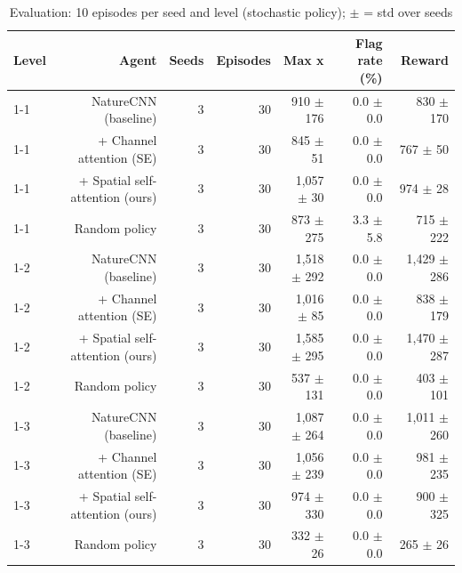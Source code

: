 \begin{table}[t]
\centering
\caption{Evaluation: 10 episodes per seed and level (stochastic policy); $\pm$ = std over seeds}
\label{tab:eval_summary}
\begin{tabular}{lrrrrrr}
\toprule
Level & Agent & Seeds & Episodes & Max x & Flag rate (\%) & Reward \\
\midrule
1-1 & NatureCNN (baseline) & 3 & 30 & 910 $\pm$ 176 & 0.0 $\pm$ 0.0 & 830 $\pm$ 170 \\
1-1 & + Channel attention (SE) & 3 & 30 & 845 $\pm$ 51 & 0.0 $\pm$ 0.0 & 767 $\pm$ 50 \\
1-1 & + Spatial self-attention (ours) & 3 & 30 & 1,057 $\pm$ 30 & 0.0 $\pm$ 0.0 & 974 $\pm$ 28 \\
1-1 & Random policy & 3 & 30 & 873 $\pm$ 275 & 3.3 $\pm$ 5.8 & 715 $\pm$ 222 \\
1-2 & NatureCNN (baseline) & 3 & 30 & 1,518 $\pm$ 292 & 0.0 $\pm$ 0.0 & 1,429 $\pm$ 286 \\
1-2 & + Channel attention (SE) & 3 & 30 & 1,016 $\pm$ 85 & 0.0 $\pm$ 0.0 & 838 $\pm$ 179 \\
1-2 & + Spatial self-attention (ours) & 3 & 30 & 1,585 $\pm$ 295 & 0.0 $\pm$ 0.0 & 1,470 $\pm$ 287 \\
1-2 & Random policy & 3 & 30 & 537 $\pm$ 131 & 0.0 $\pm$ 0.0 & 403 $\pm$ 101 \\
1-3 & NatureCNN (baseline) & 3 & 30 & 1,087 $\pm$ 264 & 0.0 $\pm$ 0.0 & 1,011 $\pm$ 260 \\
1-3 & + Channel attention (SE) & 3 & 30 & 1,056 $\pm$ 239 & 0.0 $\pm$ 0.0 & 981 $\pm$ 235 \\
1-3 & + Spatial self-attention (ours) & 3 & 30 & 974 $\pm$ 330 & 0.0 $\pm$ 0.0 & 900 $\pm$ 325 \\
1-3 & Random policy & 3 & 30 & 332 $\pm$ 26 & 0.0 $\pm$ 0.0 & 265 $\pm$ 26 \\
\bottomrule
\end{tabular}
\end{table}
